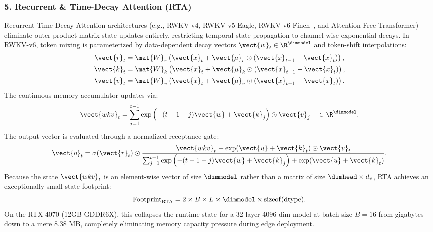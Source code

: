 \subsubsection{5. Recurrent \& Time-Decay Attention (RTA)}
\label{subsubsec:rta_contract}
Recurrent Time-Decay Attention architectures (e.g., RWKV-v4, RWKV-v5 Eagle, RWKV-v6 Finch~\cite{peng2023rwkv}, and Attention Free Transformer) eliminate outer-product matrix-state updates entirely, restricting temporal state propagation to channel-wise exponential decays. In RWKV-v6, token mixing is parameterized by data-dependent decay vectors $\vect{w}_t \in \R^{\dimmodel}$ and token-shift interpolations:
\begin{align}
\vect{r}_t &= \mat{W}_r \left( \vect{x}_t + \vect{\mu}_r \odot (\vect{x}_{t-1} - \vect{x}_t) \right), \\
\vect{k}_t &= \mat{W}_k \left( \vect{x}_t + \vect{\mu}_k \odot (\vect{x}_{t-1} - \vect{x}_t) \right), \\
\vect{v}_t &= \mat{W}_v \left( \vect{x}_t + \vect{\mu}_v \odot (\vect{x}_{t-1} - \vect{x}_t) \right).
\end{align}
The continuous memory accumulator updates via:
\begin{equation}
\vect{wkv}_t = \sum_{j=1}^{t-1} \exp\left( -(t - 1 - j)\vect{w} + \vect{k}_j \right) \odot \vect{v}_j \quad \in \R^{\dimmodel}.
\end{equation}
The output vector is evaluated through a normalized receptance gate:
\begin{equation}
\vect{o}_t = \sigma(\vect{r}_t) \odot \frac{\vect{wkv}_t + \exp(\vect{u} + \vect{k}_t) \odot \vect{v}_t}{\sum_{j=1}^{t-1} \exp\left( -(t - 1 - j)\vect{w} + \vect{k}_j \right) + \exp(\vect{u} + \vect{k}_t)}.
\end{equation}
Because the state $\vect{wkv}_t$ is an element-wise vector of size $\dimmodel$ rather than a matrix of size $\dimhead \times d_v$, RTA achieves an exceptionally small state footprint:
\begin{equation}
\operatorname{Footprint}_{\text{RTA}} = 2 \times B \times L \times \dimmodel \times \operatorname{sizeof}(\text{dtype}).
\end{equation}
On the RTX 4070 (12GB GDDR6X), this collapses the runtime state for a 32-layer 4096-dim model at batch size $B=16$ from gigabytes down to a mere $8.38\text{ MB}$, completely eliminating memory capacity pressure during edge deployment.

